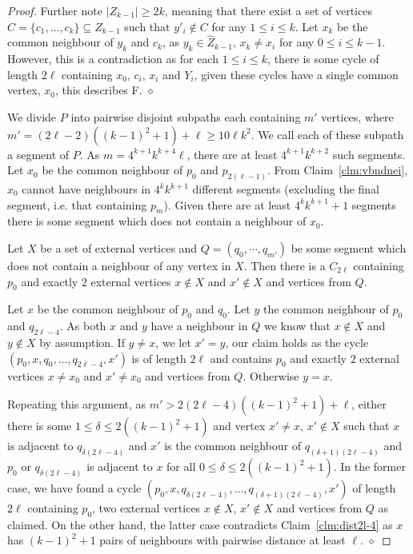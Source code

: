 \documentclass[runningheads,envcountsame]{llncs}
\newcommand{\forbiddenGraph}{F}
\newenvironment{claimproof}
{\noindent {\em Proof of Claim:} }
{\hfill $\diamond$ \smallskip}
\begin{document}
\begin{proof}
\begin{claimproof}
        Further note $|Z_{k-1}| \geq 2k$, meaning that there exist a set of vertices $C = \{c_1,\ldots,c_k\} \subseteq Z_{k-1}$ such that $y'_i \notin C$ for any $1 \leq i \leq k$.
        Let $x_k$ be the common neighbour of $y_k$ and $c_k$, as $y_k \in \hat{Z}_{k-1}$, $x_k \neq x_i$ for any $0 \leq i \leq k-1$. However, this is a contradiction as for each $1 \leq i \leq k$, there is some cycle of length $2\ell$ containing $x_0$, $c_i$, $x_i$ and $Y_i$, given these cycles have a single common vertex, $x_0$, this describes \forbiddenGraph.
    \end{claimproof}

    We divide $P$ into pairwise disjoint subpaths each containing $m'$ vertices, where $m' = (2\ell-2)((k-1)^2+1)+\ell \geq 10\ell k^2$. We call each of these subpath a segment of $P$. As $m = 4^{k+1}k^{k+4}\ell$, there are at least $4^{k+1}k^{k+2}$ such segments. Let $x_0$ be the common neighbour of $p_0$ and $p_{2(\ell-1)}$. From Claim~\ref{clm:vbndnei}, $x_0$ cannot have neighbours in $4^kk^{k+1}$ different segments (excluding the final segment, i.e. that containing $p_m$). Given there are at least $4^kk^{k+1}+1$ segments there is some segment which does not contain a neighbour of $x_0$.

    \begin{mclaim}\label{clm-seg}
        Let $X$ be a set of external vertices and $Q = (q_0, \cdots, q_{m'})$ be some segment which does not contain a neighbour of any vertex in $X$. Then there is a $C_{2\ell}$ containing $p_0$ and exactly $2$ external vertices $ x\notin X$ and $x' \notin X$ and vertices from $Q$.
    \end{mclaim}
    \begin{claimproof}
        Let $x$ be the common neighbour of $p_0$ and $q_0$. Let $y$ the common neighbour of $p_0$ and $q_{2\ell-4}$. As both $x$ and $y$ have a neighbour in $Q$ we know that $x\notin X$ and $y\notin X$ by assumption. If $y \neq x$, we let $x'=y$, our claim holds as the cycle $(p_0,x,q_0, \dots, q_{2\ell-4},x')$ is of length $2\ell$ and contains $p_0$ and exactly $2$ external vertices $ x\neq x_0$ and $x' \neq x_0$ and vertices from $Q$. Otherwise $y = x$.

        
        Repeating this argument, as $m' > 2(2\ell-4)((k-1)^2+1)+\ell$, either there is some $1 \leq \delta \leq 2((k-1)^2+1)$ and vertex $x' \neq x$, $x' \notin  X$ such that $x$ is adjacent to $q_{\delta(2\ell-4)}$ and $x'$ is the common neighbour of $q_{(\delta+1)(2\ell-4)}$ and $p_0$ or $q_{\delta(2\ell-4)}$ is adjacent to $x$ for all $0 \leq \delta \leq 2((k-1)^2+1)$. In the former case, we have found a cycle $(p_0, x, q_{\delta(2\ell-4)}, \dots, q_{(\delta+1)(2\ell-4)}, x')$ of length $2\ell$ containing $p_0$, two external vertices $x\notin X$, $x'\notin X$ and vertices from $Q$ as claimed.  On the other hand, the latter case contradicts Claim~\ref{clm:dist2l-4} as $x$ has $(k-1)^2+1$ pairs of neighbours with pairwise distance at least $\ell$. 
    \end{claimproof}


\end{proof}
\end{document}
